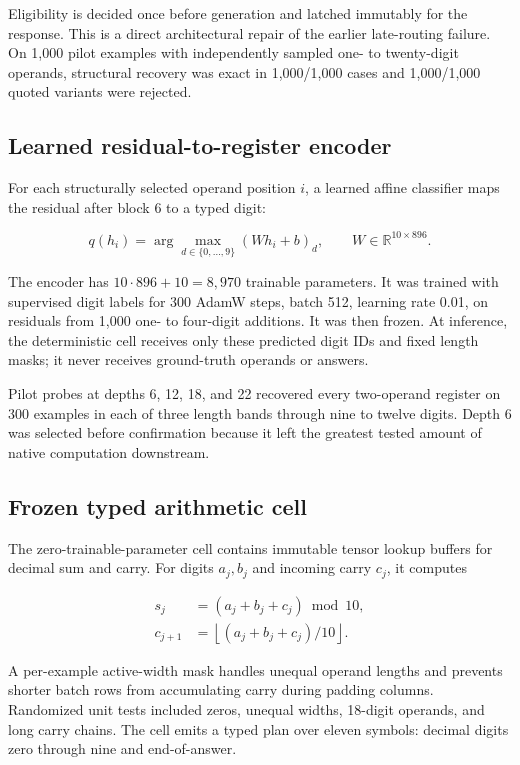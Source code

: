 \documentclass[11pt]{article}
\begin{document}
Eligibility is decided once before generation and latched immutably for the
response. This is a direct architectural repair of the earlier late-routing
failure. On 1,000 pilot examples with independently sampled one- to
twenty-digit operands, structural recovery was exact in 1,000/1,000 cases and
1,000/1,000 quoted variants were rejected.

\subsection{Learned residual-to-register encoder}

For each structurally selected operand position \(i\), a learned affine
classifier maps the residual after block 6 to a typed digit:

\[
q(h_i)=\arg\max_{d\in\{0,\ldots,9\}} (Wh_i+b)_d,
\qquad
W\in\mathbb{R}^{10\times896}.
\]

The encoder has \(10\cdot896+10=8{,}970\) trainable parameters. It was trained
with supervised digit labels for 300 AdamW steps, batch 512, learning rate
0.01, on residuals from 1,000 one- to four-digit additions. It was then frozen.
At inference, the deterministic cell receives only these predicted digit IDs
and fixed length masks; it never receives ground-truth operands or answers.

Pilot probes at depths 6, 12, 18, and 22 recovered every two-operand register
on 300 examples in each of three length bands through nine to twelve digits.
Depth 6 was selected before confirmation because it left the greatest tested
amount of native computation downstream.

\subsection{Frozen typed arithmetic cell}

The zero-trainable-parameter cell contains immutable tensor lookup buffers for
decimal sum and carry. For digits \(a_j,b_j\) and incoming carry \(c_j\), it
computes

\begin{align}
s_j &= (a_j+b_j+c_j)\bmod 10,\\
c_{j+1} &= \left\lfloor(a_j+b_j+c_j)/10\right\rfloor.
\end{align}

A per-example active-width mask handles unequal operand lengths and prevents
shorter batch rows from accumulating carry during padding columns. Randomized
unit tests included zeros, unequal widths, 18-digit operands, and long carry
chains. The cell emits a typed plan over eleven symbols: decimal digits zero
through nine and end-of-answer.
\end{document}
